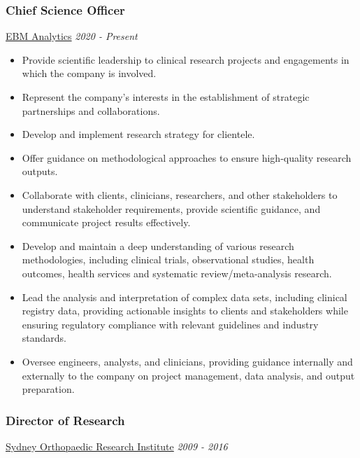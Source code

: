 \documentclass[
  letterpaper,
  DIV=11,
  numbers=noendperiod]{scrartcl}
\providecommand{\tightlist}{%
  \setlength{\itemsep}{0pt}\setlength{\parskip}{0pt}}\usepackage{longtable,booktabs,array}
\begin{document}
\subsubsection{Chief Science Officer}\label{chief-science-officer}

\href{www.ebmanalytics.com.au}{EBM Analytics} {\emph{2020 - Present}}

\begin{itemize}
\tightlist
\item
  Provide scientific leadership to clinical research projects and
  engagements in which the company is involved.
\item
  Represent the company's interests in the establishment of strategic
  partnerships and collaborations.
\item
  Develop and implement research strategy for clientele.
\item
  Offer guidance on methodological approaches to ensure high-quality
  research outputs.
\item
  Collaborate with clients, clinicians, researchers, and other
  stakeholders to understand stakeholder requirements, provide
  scientific guidance, and communicate project results effectively.
\item
  Develop and maintain a deep understanding of various research
  methodologies, including clinical trials, observational studies,
  health outcomes, health services and systematic review/meta-analysis
  research.
\item
  Lead the analysis and interpretation of complex data sets, including
  clinical registry data, providing actionable insights to clients and
  stakeholders while ensuring regulatory compliance with relevant
  guidelines and industry standards.
\item
  Oversee engineers, analysts, and clinicians, providing guidance
  internally and externally to the company on project management, data
  analysis, and output preparation.
\end{itemize}

\subsubsection{Director of Research}\label{director-of-research}

\href{www.sori.com.au}{Sydney Orthopaedic Research Institute}
{\emph{2009 - 2016}}
\end{document}
